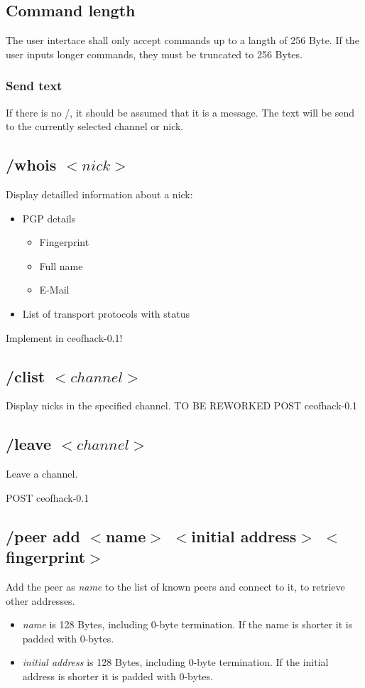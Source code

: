 \documentclass[12pt,a4paper]{book}
\begin{document}
\subsection{Command length}
The user intertace shall only accept commands up to a langth of 256 Byte.
If the user inputs longer commands, they must be truncated
to 256 Bytes.
\subsubsection{Send text}
If there is no /, it should be assumed that it is a message.
The text will be send to the currently selected channel or nick.

\subsection{/whois $<nick>$}
Display detailled information about a nick:
\begin{itemize}
\item PGP details
\begin{itemize}
\item Fingerprint
\item Full name
\item E-Mail
\end{itemize}
\item List of transport protocols with status
\end{itemize}

Implement in ceofhack-0.1!
\subsection{/clist $<channel>$}
Display nicks in the specified channel.
TO BE REWORKED
POST ceofhack-0.1

\subsection{/leave $<channel>$}
Leave a channel.

POST ceofhack-0.1


\subsection{/peer add $<$name$>$ $<$initial address$>$ $<$fingerprint$>$}
Add the peer as \textit{name} to the list of known peers
and connect to it, to retrieve other addresses.
\begin{itemize}
\item \textit{name} is 128 Bytes, including 0-byte termination.
If the name is shorter it is padded with 0-bytes.
\item \textit{initial address} is 128 Bytes, including 0-byte termination.
If the initial address is shorter it is padded with 0-bytes.
\end{itemize}
\end{document}
